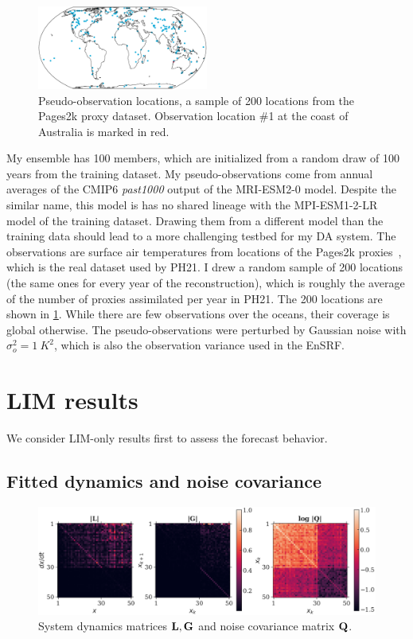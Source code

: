 \documentclass[parskip=half,DIV=16]{scrartcl}
\begin{document}
\begin{figure}[h]
    \centering
    \includegraphics[width=0.5\textwidth]{figures/plots/obs_locations.pdf}
    \caption{Pseudo-observation locations, a sample of 200 locations from the Pages2k proxy dataset. Observation location \#1 at the coast of Australia is marked in red.}
    \label{fig:obs-locs}
\end{figure}

My ensemble has 100 members, which are initialized from a random draw of 100 years from the training dataset. My pseudo-observations come from annual averages of the CMIP6 \emph{past1000} output of the MRI-ESM2-0 model. Despite the similar name, this model is has no shared lineage with the MPI-ESM1-2-LR model of the training dataset. Drawing them from a different model than the training data should lead to a more challenging testbed for my \gls{DA} system. The observations are surface air temperatures from locations of the Pages2k proxies~\parencite{PAGESConsortium2017}, which is the real dataset used by PH21. I drew a random sample of 200 locations (the same ones for every year of the reconstruction), which is roughly the average of the number of proxies assimilated per year in PH21. The 200 locations are shown in \cref{fig:obs-locs}. While there are few observations over the oceans, their coverage is global otherwise. The pseudo-observations were perturbed by Gaussian noise with $\sigma_o^2 = \qty{1}{K^2}$, which is also the observation variance used in the \gls{EnSRF}.




\section{LIM results}

We consider \gls{LIM}-only results first to assess the forecast behavior.

\subsection{Fitted dynamics and noise covariance}

\begin{figure}[h]
    \centering
    \includegraphics{figures/plots/lim_matrices.pdf}
    \caption{System dynamics matrices $\vb{L}, \vb{G}$ and noise covariance matrix $\vb{Q}$.}
    \label{fig:lim-matrices}
\end{figure}
\end{document}
